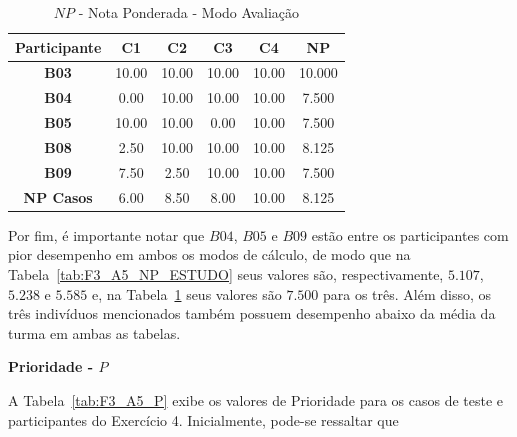 \begin{table}[htbp]
	\centering
	\caption{$NP$ - Nota Ponderada - Modo Avaliação}
	\begin{tabular}{|c|c|c|c|c|c|}
		\hline
		\rowcolor[HTML]{D9D9D9} 
		\textbf{Participante} & \textbf{C1} & \textbf{C2} & \textbf{C3} & \textbf{C4} & \textbf{NP} \\ \hline
		\rowcolor[HTML]{FFFFFF} 
		\textbf{B03} & 10.00 & 10.00 & 10.00 & 10.00 & 10.000 \\ \hline
		\rowcolor[HTML]{E7E6E6} 
		\textbf{B04} & 0.00 & 10.00 & 10.00 & 10.00 & 7.500 \\ \hline
		\rowcolor[HTML]{FFFFFF} 
		\textbf{B05} & 10.00 & 10.00 & 0.00 & 10.00 & 7.500 \\ \hline
		\rowcolor[HTML]{E7E6E6} 
		\textbf{B08} & 2.50 & 10.00 & 10.00 & 10.00 & 8.125 \\ \hline
		\rowcolor[HTML]{FFFFFF} 
		\textbf{B09} & 7.50 & 2.50 & 10.00 & 10.00 & 7.500 \\ \hline
		\rowcolor[HTML]{D9D9D9} 
		\textbf{NP Casos} & 6.00 & 8.50 & 8.00 & 10.00 & 8.125 \\ \hline
	\end{tabular}
	\label{tab:F3_A5_NP_AVALIACAO}
\end{table}

Por fim, é importante notar que $B04$, $B05$ e $B09$ estão entre os participantes com pior desempenho em ambos os modos de cálculo, de modo que na Tabela~\ref{tab:F3_A5_NP_ESTUDO} seus valores são, respectivamente, $5.107$, $5.238$ e $5.585$ e, na Tabela~\ref{tab:F3_A5_NP_AVALIACAO} seus valores são $7.500$ para os três. Além disso, os três indivíduos mencionados também possuem desempenho abaixo da média da turma em ambas as tabelas.

\textbf{Prioridade - $P$}

A Tabela~\ref{tab:F3_A5_P} exibe os valores de Prioridade para os casos de teste e participantes do Exercício 4. Inicialmente, pode-se ressaltar que 

